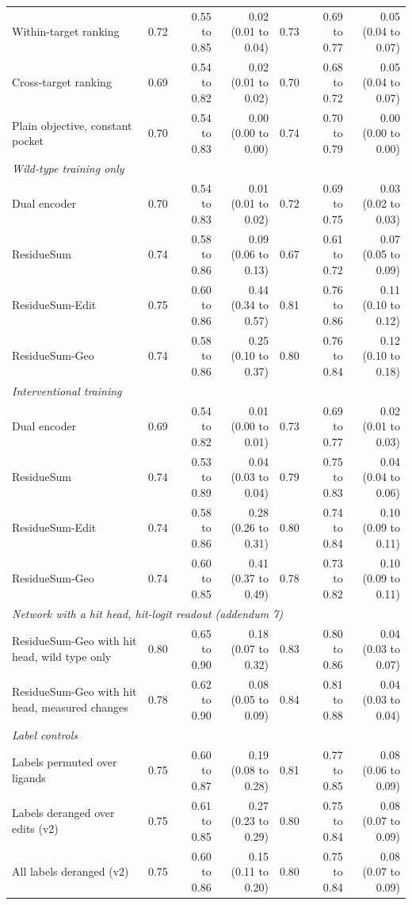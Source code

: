 \begin{table}[t]
{\begin{tabular}{lrrrrrr}
\quad Within-target ranking & 0.72 & 0.55 to 0.85 & 0.02 (0.01 to 0.04) & 0.73 & 0.69 to 0.77 & 0.05 (0.04 to 0.07) \\
\quad Cross-target ranking & 0.69 & 0.54 to 0.82 & 0.02 (0.01 to 0.02) & 0.70 & 0.68 to 0.72 & 0.05 (0.04 to 0.07) \\
\quad Plain objective, constant pocket & 0.70 & 0.54 to 0.83 & 0.00 (0.00 to 0.00) & 0.74 & 0.70 to 0.79 & 0.00 (0.00 to 0.00) \\
\midrule
\multicolumn{7}{l}{\emph{Wild-type training only}} \\
\quad Dual encoder & 0.70 & 0.54 to 0.83 & 0.01 (0.01 to 0.02) & 0.72 & 0.69 to 0.75 & 0.03 (0.02 to 0.03) \\
\quad ResidueSum & 0.74 & 0.58 to 0.86 & 0.09 (0.06 to 0.13) & 0.67 & 0.61 to 0.72 & 0.07 (0.05 to 0.09) \\
\quad ResidueSum-Edit & 0.75 & 0.60 to 0.86 & 0.44 (0.34 to 0.57) & 0.81 & 0.76 to 0.86 & 0.11 (0.10 to 0.12) \\
\quad ResidueSum-Geo & 0.74 & 0.58 to 0.86 & 0.25 (0.10 to 0.37) & 0.80 & 0.76 to 0.84 & 0.12 (0.10 to 0.18) \\
\midrule
\multicolumn{7}{l}{\emph{Interventional training}} \\
\quad Dual encoder & 0.69 & 0.54 to 0.82 & 0.01 (0.00 to 0.01) & 0.73 & 0.69 to 0.77 & 0.02 (0.01 to 0.03) \\
\quad ResidueSum & 0.74 & 0.53 to 0.89 & 0.04 (0.03 to 0.04) & 0.79 & 0.75 to 0.83 & 0.04 (0.04 to 0.06) \\
\quad ResidueSum-Edit & 0.74 & 0.58 to 0.86 & 0.28 (0.26 to 0.31) & 0.80 & 0.74 to 0.84 & 0.10 (0.09 to 0.11) \\
\quad ResidueSum-Geo & 0.74 & 0.60 to 0.85 & 0.41 (0.37 to 0.49) & 0.78 & 0.73 to 0.82 & 0.10 (0.09 to 0.11) \\
\midrule
\multicolumn{7}{l}{\emph{Network with a hit head, hit-logit readout (addendum 7)}} \\
\quad ResidueSum-Geo with hit head, wild type only & 0.80 & 0.65 to 0.90 & 0.18 (0.07 to 0.32) & 0.83 & 0.80 to 0.86 & 0.04 (0.03 to 0.07) \\
\quad ResidueSum-Geo with hit head, measured changes & 0.78 & 0.62 to 0.90 & 0.08 (0.05 to 0.09) & 0.84 & 0.81 to 0.88 & 0.04 (0.03 to 0.04) \\
\midrule
\multicolumn{7}{l}{\emph{Label controls}} \\
\quad Labels permuted over ligands & 0.75 & 0.60 to 0.87 & 0.19 (0.08 to 0.28) & 0.81 & 0.77 to 0.85 & 0.08 (0.06 to 0.09) \\
\quad Labels deranged over edits (v2) & 0.75 & 0.61 to 0.85 & 0.27 (0.23 to 0.29) & 0.80 & 0.75 to 0.84 & 0.08 (0.07 to 0.09) \\
\quad All labels deranged (v2) & 0.75 & 0.60 to 0.86 & 0.15 (0.11 to 0.20) & 0.80 & 0.75 to 0.84 & 0.08 (0.07 to 0.09) \\
\bottomrule
\end{tabular}}
\end{table}
